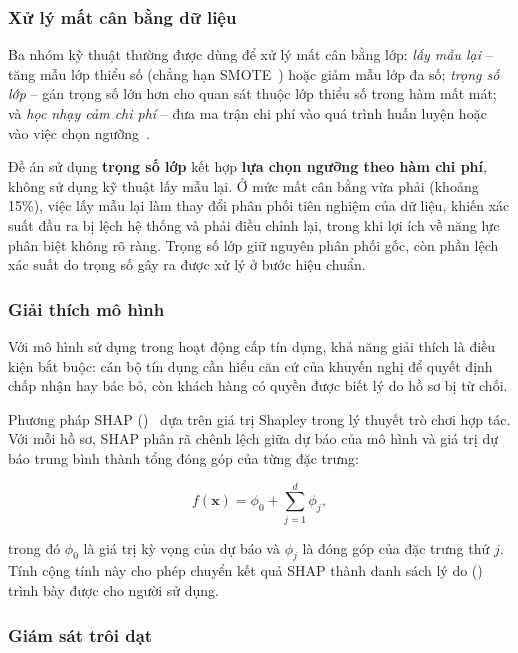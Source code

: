 \subsubsection{Xử lý mất cân bằng dữ liệu}

Ba nhóm kỹ thuật thường được dùng để xử lý mất cân bằng lớp: \textit{lấy mẫu lại}
-- tăng mẫu lớp thiểu số (chẳng hạn SMOTE~\cite{chawla2002}) hoặc giảm mẫu lớp đa
số; \textit{trọng số lớp} -- gán trọng số lớn hơn cho quan sát thuộc lớp thiểu số
trong hàm mất mát; và \textit{học nhạy cảm chi phí} -- đưa ma trận chi phí vào
quá trình huấn luyện hoặc vào việc chọn ngưỡng~\cite{elkan2001}.

Đề án sử dụng \textbf{trọng số lớp} kết hợp \textbf{lựa chọn ngưỡng theo hàm chi
phí}, không sử dụng kỹ thuật lấy mẫu lại. Ở mức mất cân bằng vừa phải (khoảng
15\%), việc lấy mẫu lại làm thay đổi phân phối tiên nghiệm của dữ liệu, khiến xác
suất đầu ra bị lệch hệ thống và phải điều chỉnh lại, trong khi lợi ích về năng
lực phân biệt không rõ ràng. Trọng số lớp giữ nguyên phân phối gốc, còn phần lệch
xác suất do trọng số gây ra được xử lý ở bước hiệu chuẩn.

\subsubsection{Giải thích mô hình}

Với mô hình sử dụng trong hoạt động cấp tín dụng, khả năng giải thích là điều
kiện bắt buộc: cán bộ tín dụng cần hiểu căn cứ của khuyến nghị để quyết định chấp
nhận hay bác bỏ, còn khách hàng có quyền được biết lý do hồ sơ bị từ chối.

Phương pháp SHAP ()~\cite{lundberg2017,lundberg2020} dựa trên giá trị Shapley trong lý
thuyết trò chơi hợp tác. Với mỗi hồ sơ, SHAP phân rã chênh lệch giữa dự báo của
mô hình và giá trị dự báo trung bình thành tổng đóng góp của từng đặc trưng:

\begin{equation}
f(\bm{x}) = \phi_0 + \sum_{j=1}^{d} \phi_j,
\label{eq:shap}
\end{equation}

trong đó $\phi_0$ là giá trị kỳ vọng của dự báo và $\phi_j$ là đóng góp của đặc
trưng thứ $j$. Tính cộng tính này cho phép chuyển kết quả SHAP thành danh sách lý
do () trình bày được cho người sử dụng.

\subsubsection{Giám sát trôi dạt}


